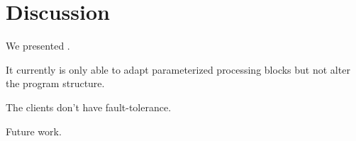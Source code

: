 \section{Discussion}
\label{sec:discussion}

We presented \sysname{}.

It currently is only able to adapt parameterized processing blocks but not alter
the program structure.

The clients don't have fault-tolerance.

\lipsum[1-2]

Future work.

